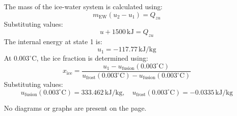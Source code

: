 The mass of the ice-water system is calculated using:  
\[
m_{\text{EW}}(u_2 - u_1) = Q_{zu}
\]  
Substituting values:  
\[
u + 1500 \, \text{kJ} = Q_{zu}
\]  
The internal energy at state 1 is:  
\[
u_1 = -117.77 \, \text{kJ/kg}
\]  
At \( 0.003^\circ\text{C} \), the ice fraction is determined using:  
\[
x_{\text{ice}} = \frac{u_1 - u_{\text{fusion}}(0.003^\circ\text{C})}{u_{\text{frost}}(0.003^\circ\text{C}) - u_{\text{fusion}}(0.003^\circ\text{C})}
\]  
Substituting values:  
\[
u_{\text{fusion}}(0.003^\circ\text{C}) = 333.462 \, \text{kJ/kg}, \quad u_{\text{frost}}(0.003^\circ\text{C}) = -0.0335 \, \text{kJ/kg}
\]  

No diagrams or graphs are present on the page.